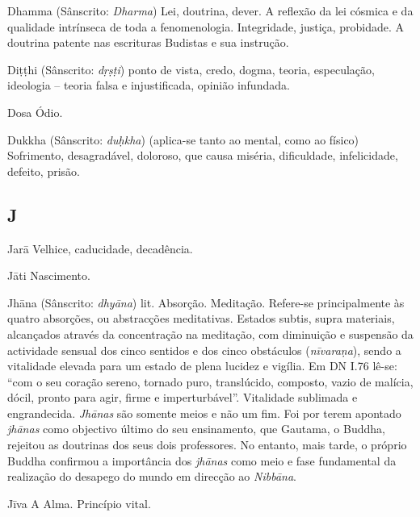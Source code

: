 \begin{glossarydescription}

\item[Dhamma] (Sânscrito: \emph{Dharma}) Lei, doutrina, dever. A reflexão da
lei cósmica e da qualidade intrínseca de toda a fenomenologia. Integridade,
justiça, probidade. A doutrina patente nas escrituras Budistas e sua
instrução.

\item[Diṭṭhi] (Sânscrito: \emph{dṛṣṭi}) ponto de vista, credo, dogma, teoria,
especulação, ideologia -- teoria falsa e injustificada, opinião infundada.

\item[Dosa] Ódio.

\item[Dukkha] (Sânscrito: \emph{duḥkha}) (aplica-se tanto ao mental, como ao
físico) Sofrimento, desagradável, doloroso, que causa miséria, dificuldade,
infelicidade, defeito, prisão.

\end{glossarydescription}

\subsection{J}

\begin{glossarydescription}

\item[Jarā] Velhice, caducidade, decadência.

\item[Jāti] Nascimento.

\item[Jhāna] (Sânscrito: \emph{dhyāna}) lit. Absorção. Meditação. Refere-se
principalmente às quatro absorções, ou abstracções meditativas. Estados subtis,
supra materiais, alcançados através da concentração na meditação, com diminuição
e suspensão da actividade sensual dos cinco sentidos e dos cinco obstáculos
(\emph{nīvaraṇa}), sendo a vitalidade elevada para um estado de plena lucidez e
vigília. Em DN I.76 lê-se: ``com o seu coração sereno, tornado puro, translúcido,
composto, vazio de malícia, dócil, pronto para agir, firme e imperturbável''.
Vitalidade sublimada e engrandecida. \emph{Jhānas} são somente meios e não um
fim. Foi por terem apontado \emph{jhānas} como objectivo último do seu
ensinamento, que Gautama, o Buddha, rejeitou as doutrinas dos seus dois
professores. No entanto, mais tarde, o próprio Buddha confirmou a importância
dos \emph{jhānas} como meio e fase fundamental da realização do desapego do
mundo em direcção ao \emph{Nibbāna}.

\item[Jīva] A Alma. Princípio vital.

\end{glossarydescription}

